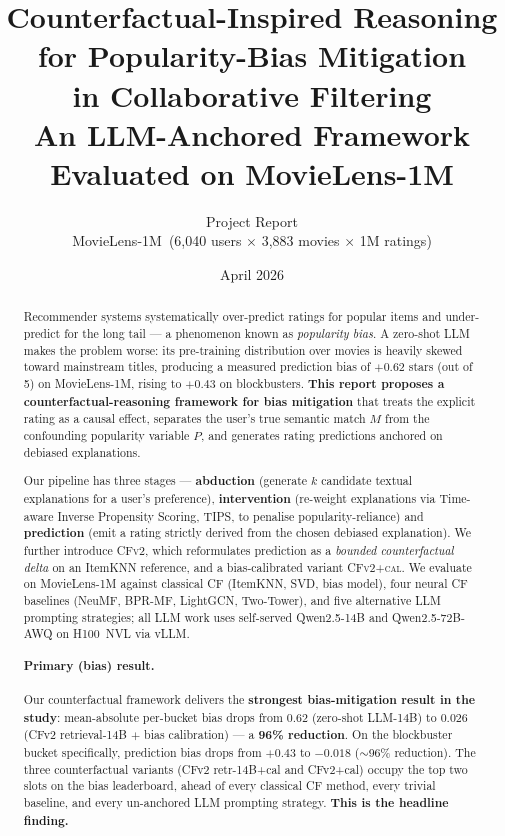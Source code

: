 \documentclass[11pt,a4paper]{article}
\title{
  \LARGE \textbf{Counterfactual-Inspired Reasoning for Popularity-Bias Mitigation\\ in Collaborative Filtering}\\[4pt]
  \large An LLM-Anchored Framework Evaluated on MovieLens-1M
}
\author{%
  Project Report \\[2pt]
  \small MovieLens-1M \,(6{,}040 users $\times$ 3{,}883 movies $\times$ 1M ratings)
}
\date{April 2026}
\newcommand{\best}[1]{\textcolor{goodgreen}{\textbf{#1}}}
\begin{document}
\maketitle
\thispagestyle{fancy}

\begin{abstract}
\noindent
Recommender systems systematically over-predict ratings for popular items
and under-predict for the long tail --- a phenomenon known as
\emph{popularity bias}. A zero-shot LLM makes the problem worse: its
pre-training distribution over movies is heavily skewed toward mainstream
titles, producing a measured prediction bias of $+0.62$ stars (out of 5)
on MovieLens-1M, rising to $+0.43$ on blockbusters. \textbf{This report
proposes a counterfactual-reasoning framework for bias mitigation} that
treats the explicit rating as a causal effect, separates the user's true
semantic match $M$ from the confounding popularity variable $P$, and
generates rating predictions anchored on debiased explanations.

Our pipeline has three stages --- \textbf{abduction} (generate $k$
candidate textual explanations for a user's preference), \textbf{intervention}
(re-weight explanations via Time-aware Inverse Propensity Scoring, TIPS, to
penalise popularity-reliance) and \textbf{prediction} (emit a rating
strictly derived from the chosen debiased explanation). We further
introduce \textsc{CFv2}, which reformulates prediction as a \emph{bounded
counterfactual delta} on an ItemKNN reference, and a bias-calibrated
variant \textsc{CFv2+cal}. We evaluate on MovieLens-1M against
classical CF (ItemKNN, SVD, bias model), four neural CF baselines (NeuMF,
BPR-MF, LightGCN, Two-Tower), and five alternative LLM prompting
strategies; all LLM work uses self-served Qwen2.5-14B and
Qwen2.5-72B-AWQ on H100~NVL via vLLM.

\paragraph{Primary (bias) result.} Our counterfactual framework delivers the
\textbf{strongest bias-mitigation result in the study}: mean-absolute
per-bucket bias drops from $0.62$ (zero-shot LLM-14B) to \best{$0.026$}
(CFv2 retrieval-14B $+$ bias calibration) --- a \textbf{96\% reduction}.
On the blockbuster bucket specifically, prediction bias drops from
$+0.43$ to $\mathbf{-0.018}$ ($\sim$96\% reduction). The three
counterfactual variants (CFv2 retr-14B+cal and CFv2+cal) occupy the top
two slots on the bias leaderboard, ahead of every classical CF method,
every trivial baseline, and every un-anchored LLM prompting strategy.
\textbf{This is the headline finding.}


\end{abstract}
\end{document}
